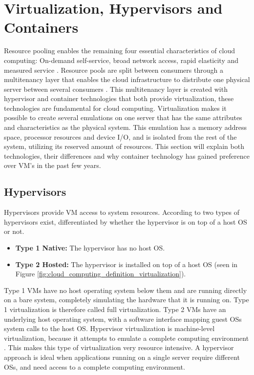 \section{Virtualization, Hypervisors and Containers}
\label{sec:virtualization}
Resource pooling enables the remaining four essential characteristics of cloud computing: On-demand self-service, broad network access, rapid elasticity and measured service \cite{bittman2009server}. Resource pools are split  between consumers through a multitenancy layer that enables the cloud infrastructure to distribute one physical server between several consumers \cite{krebs2012architectural}. This multitenancy layer is created with hypervisor and container technologies that both provide virtualization, these technologies are fundamental for cloud computing. Virtualization makes it possible to create several emulations on one server that has the same attributes and characteristics as the physical system. This emulation has a memory address space, processor resources and device I/O, and is isolated from the rest of the system, utilizing its reserved amount of resources. This section will explain both technologies, their differences and why container technology has gained preference over VM's in the past few years.

\subsection{Hypervisors}
Hypervisors provide VM access to system resources. According to \cite[p.~100]{sosinsky2010cloud} two types of hypervisors exist, differentiated by whether the hypervisor is on top of a host OS or not.

\begin{itemize}
	\item \textbf{Type 1 Native:} The hypervisor has no host OS.
	\item \textbf{Type 2 Hosted:} The hypervisor is installed on top of a host OS (seen in Figure \ref{fig:cloud_computing_definition_virtualization}).
\end{itemize}

Type 1 VMs have no host operating system below them and are running directly on a bare system, completely simulating the hardware that it is running on. Type 1 virtualization is therefore called full virtualization. Type 2 VMs have an underlying host operating system, with a software interface mapping guest OSs system calls to the host OS. Hypervisor virtualization is machine-level virtualization, because it attempts to emulate a complete computing environment \cite{fink2014docker}. This makes this type of virtualization very resource intensive. A hypervisor approach is ideal when applications running on a single server require different OSs, and need access to a complete computing environment.

